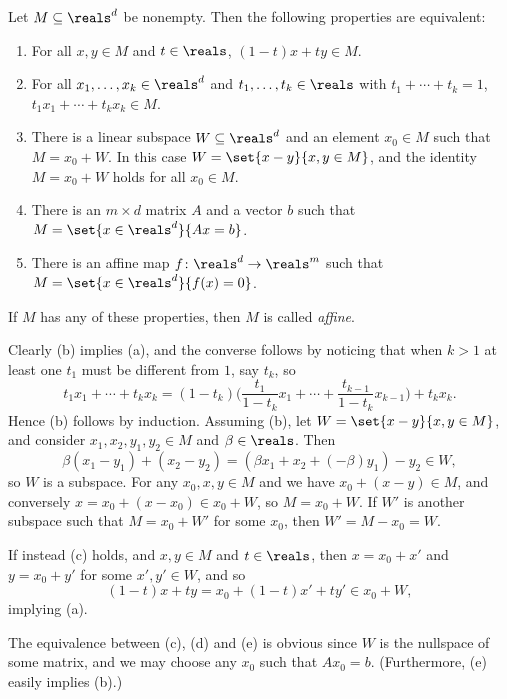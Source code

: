 \documentclass[article, a4paper, 11pt, oneside]{memoir}
\numberwithin{equation}{chapter}
\theoremstyle{nonumberplain}
\begin{document}
\begin{remark}
    Let $M \subseteq \reals^d$ be nonempty. Then the following properties are equivalent:
    \begin{enumerate}
        \item For all $x,y \in M$ and $t \in \reals$, $(1-t)x + ty \in M$.

        \item For all $x_1, \ldots, x_k \in \reals^d$ and $t_1, \ldots, t_k \in \reals$ with $t_1 + \cdots + t_k = 1$, $t_1 x_1 + \cdots + t_k x_k \in M$.

        \item There is a linear subspace $W \subseteq \reals^d$ and an element $x_0 \in M$ such that $M = x_0 + W$. In this case $W = \set{x-y}{x,y \in M}$, and the identity $M = x_0 + W$ holds for all $x_0 \in M$.

        \item There is an $m \times d$ matrix $A$ and a vector $b$ such that $M = \set{x \in \reals^d}{Ax=b}$.

        \item There is an affine map $f \colon \reals^d \to \reals^m$ such that $M = \set{x \in \reals^d}{f(x) = 0}$.
    \end{enumerate}
    If $M$ has any of these properties, then $M$ is called \emph{affine}.
    
    Clearly (b) implies (a), and the converse follows by noticing that when $k > 1$ at least one $t_1$ must be different from $1$, say $t_k$, so
    \begin{equation*}
        t_1 x_1 + \cdots + t_k x_k
            = (1-t_k) \biggl( \frac{t_1}{1-t_k} x_1 + \cdots + \frac{t_{k-1}}{1-t_k} x_{k-1} \biggr) + t_k x_k.
    \end{equation*}
    Hence (b) follows by induction. Assuming (b), let $W = \set{x-y}{x,y \in M}$, and consider $x_1,x_2,y_1,y_2 \in M$ and $\beta \in \reals$. Then
    \begin{equation*}
        \beta(x_1-y_1) + (x_2-y_2)
            = (\beta x_1 + x_2 + (-\beta)y_1) - y_2
            \in W,
    \end{equation*}
    so $W$ is a subspace. For any $x_0,x,y \in M$ and we have $x_0 + (x-y) \in M$, and conversely $x = x_0 + (x-x_0) \in x_0 + W$, so $M = x_0 + W$. If $W'$ is another subspace such that $M = x_0 + W'$ for some $x_0$, then $W' = M - x_0 = W$.
    
    If instead (c) holds, and $x,y \in M$ and $t \in \reals$, then $x = x_0 + x'$ and $y = x_0 + y'$ for some $x',y' \in W$, and so
    \begin{equation*}
        (1-t)x + ty
            = x_0 + (1-t)x' + ty'
            \in x_0 + W,
    \end{equation*}
    implying (a).

    The equivalence between (c), (d) and (e) is obvious since $W$ is the nullspace of some matrix, and we may choose any $x_0$ such that $Ax_0 = b$. (Furthermore, (e) easily implies (b).)
\end{remark}
\end{document}
